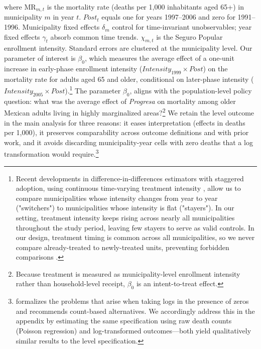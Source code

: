 \documentclass[12pt]{article}
\begin{document}
\p \noindent where $\text{MR}_{m,t}$ is the mortality rate (deaths per 1,000 inhabitants aged 65+) in municipality $m$ in year $t$. $\textit{Post}_{t}$ equals one for years 1997--2006 and zero for 1991--1996. Municipality fixed effects $\delta_{m}$ control for time-invariant unobservables; year fixed effects $\gamma_{t}$ absorb common time trends. $\chi_{m,t}$ is the Seguro Popular enrollment intensity. Standard errors are clustered at the municipality level. Our parameter of interest is $\beta_0$, which measures the average effect of a one-unit increase in early-phase enrollment intensity ($\textit{Intensity}_{1999} \times \textit{Post}$) on the mortality rate for adults aged 65 and older, conditional on later-phase intensity ($\textit{Intensity}_{2005} \times \textit{Post}$).\footnote{Recent developments in difference-in-differences estimators with staggered adoption, using continuous time-varying treatment intensity \citep{deChaisemartinDHaultfoeuille2024IntertemporalDiD}, allow us to compare municipalities whose intensity changes from year to year ("switchers") to municipalities whose intensity is flat ("stayers"). In our setting, treatment intensity keeps rising across nearly all municipalities throughout the study period, leaving few stayers to serve as valid controls. In our design, treatment timing is common across all municipalities, so we never compare already-treated to newly-treated units, preventing forbidden comparisons \citep{callaway2021difference, sun2021estimating, de2020two}.} The parameter $\beta_0$, aligns with the population-level policy question: what was the average effect of \textit{Progresa} on mortality among older Mexican adults living in highly marginalized areas?\footnote{Because treatment is measured as municipality-level enrollment intensity rather than household-level receipt, $\beta_0$ is an intent-to-treat effect.} We retain the level outcome in the main analysis for three reasons: it eases interpretation (effects in deaths per 1,000), it preserves comparability across outcome definitions and with prior work, and it avoids discarding municipality-year cells with zero deaths that a log transformation would require.\footnote{\cite{ChenRoth2024QJE} formalizes the problems that arise when taking logs in the presence of zeros and recommends count-based alternatives. We accordingly address this in the appendix by estimating the same specification using raw death counts (Poisson regression) and log-transformed outcomes—both yield qualitatively similar results to the level specification.}
\end{document}
